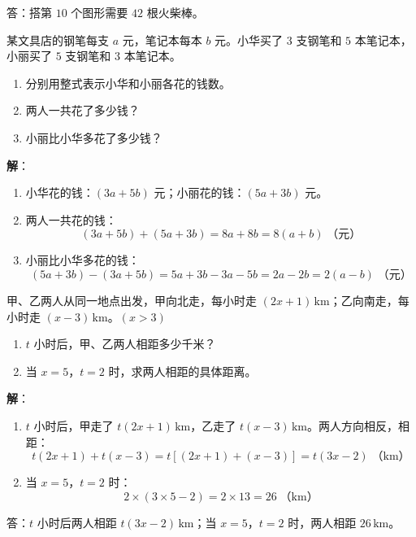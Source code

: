 \documentclass[12pt, a4paper]{ctexart}
\begin{document}
答：搭第 $10$ 个图形需要 $42$ 根火柴棒。

\begin{appbox}[【应用3】购物方案比较]
某文具店的钢笔每支 $a$ 元，笔记本每本 $b$ 元。小华买了 $3$ 支钢笔和 $5$ 本笔记本，小丽买了 $5$ 支钢笔和 $3$ 本笔记本。

\begin{enumerate}[leftmargin=*]
  \item 分别用整式表示小华和小丽各花的钱数。
  \item 两人一共花了多少钱？
  \item 小丽比小华多花了多少钱？
\end{enumerate}
\end{appbox}

\textbf{解}：
\begin{enumerate}[leftmargin=*]
  \item 小华花的钱：$(3a + 5b)$ 元；小丽花的钱：$(5a + 3b)$ 元。
  \item 两人一共花的钱：
  \[
  (3a + 5b) + (5a + 3b) = 8a + 8b = 8(a + b)\;\text{（元）}
  \]
  \item 小丽比小华多花的钱：
  \[
  (5a + 3b) - (3a + 5b) = 5a + 3b - 3a - 5b = 2a - 2b = 2(a - b)\;\text{（元）}
  \]
\end{enumerate}

\begin{appbox}[【应用4】行程问题]
甲、乙两人从同一地点出发，甲向北走，每小时走 $(2x + 1)\,\mathrm{km}$；乙向南走，每小时走 $(x - 3)\,\mathrm{km}$。$(x > 3)$

\begin{enumerate}[leftmargin=*]
  \item $t$ 小时后，甲、乙两人相距多少千米？
  \item 当 $x = 5$，$t = 2$ 时，求两人相距的具体距离。
\end{enumerate}
\end{appbox}

\textbf{解}：
\begin{enumerate}[leftmargin=*]
  \item $t$ 小时后，甲走了 $t(2x + 1)\,\mathrm{km}$，乙走了 $t(x - 3)\,\mathrm{km}$。两人方向相反，相距：
  \[
  t(2x + 1) + t(x - 3) = t[(2x + 1) + (x - 3)] = t(3x - 2)\;\text{（km）}
  \]
  \item 当 $x = 5$，$t = 2$ 时：
  \[
  2 \times (3 \times 5 - 2) = 2 \times 13 = 26\;\text{（km）}
  \]
\end{enumerate}

答：$t$ 小时后两人相距 $t(3x - 2)\,\mathrm{km}$；当 $x=5$，$t=2$ 时，两人相距 $26\,\mathrm{km}$。
\end{document}
